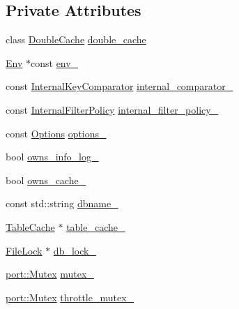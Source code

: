 \subsection*{Private Attributes}
\begin{DoxyCompactItemize}
\item 
class \hyperlink{classleveldb_1_1_double_cache}{Double\+Cache} \hyperlink{classleveldb_1_1_d_b_impl_afc7fd304e76ad7dff564daee8845deab}{double\+\_\+cache}
\item 
\hyperlink{classleveldb_1_1_env}{Env} $\ast$const \hyperlink{classleveldb_1_1_d_b_impl_a7fb25ed1dcd76b241029e036d3d2fdf0}{env\+\_\+}
\item 
const \hyperlink{classleveldb_1_1_internal_key_comparator}{Internal\+Key\+Comparator} \hyperlink{classleveldb_1_1_d_b_impl_a2d1fd471ffca17ebfeabf19134d4fc65}{internal\+\_\+comparator\+\_\+}
\item 
const \hyperlink{classleveldb_1_1_internal_filter_policy}{Internal\+Filter\+Policy} \hyperlink{classleveldb_1_1_d_b_impl_a4851ba3817eeffd4a3777c2f7965177f}{internal\+\_\+filter\+\_\+policy\+\_\+}
\item 
const \hyperlink{structleveldb_1_1_options}{Options} \hyperlink{classleveldb_1_1_d_b_impl_a09b2c1705618db98346b53f16ff16b64}{options\+\_\+}
\item 
bool \hyperlink{classleveldb_1_1_d_b_impl_a9a8de086d118c52c8e6e8dd78eab01ef}{owns\+\_\+info\+\_\+log\+\_\+}
\item 
bool \hyperlink{classleveldb_1_1_d_b_impl_aa790324b036b59ee0d50c5683f336648}{owns\+\_\+cache\+\_\+}
\item 
const std\+::string \hyperlink{classleveldb_1_1_d_b_impl_a3201a4624ce75ecfaf67ebac29ca2697}{dbname\+\_\+}
\item 
\hyperlink{classleveldb_1_1_table_cache}{Table\+Cache} $\ast$ \hyperlink{classleveldb_1_1_d_b_impl_aa69f3829c65fc2a0149b29926fb6fefc}{table\+\_\+cache\+\_\+}
\item 
\hyperlink{classleveldb_1_1_file_lock}{File\+Lock} $\ast$ \hyperlink{classleveldb_1_1_d_b_impl_ab2f1418890b6cd48e748805378517a5e}{db\+\_\+lock\+\_\+}
\item 
\hyperlink{classleveldb_1_1port_1_1_mutex}{port\+::\+Mutex} \hyperlink{classleveldb_1_1_d_b_impl_ac591585d5dea970b4bd1beb7553ce197}{mutex\+\_\+}
\item 
\hyperlink{classleveldb_1_1port_1_1_mutex}{port\+::\+Mutex} \hyperlink{classleveldb_1_1_d_b_impl_a66de124091d3bedd7317a807304e3d2a}{throttle\+\_\+mutex\+\_\+}
\item 

\end{DoxyCompactItemize}

